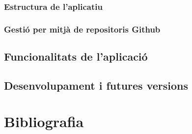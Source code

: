 \documentclass[english]{article}
\begin{document}
\subsubsection{Estructura de l'aplicatiu}
\subsubsection{Gestió per mitjà de repositoris Github}
\subsection{Funcionalitats de l'aplicació}
\subsection{Desenvolupament i futures versions}
\section{Bibliografia}
\end{document}

